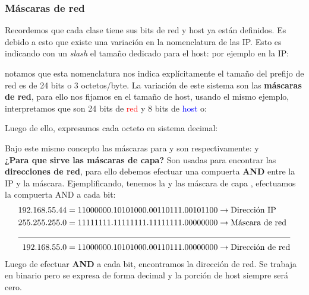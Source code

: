 \documentclass[
	12pt, %
	fleqn, %
	a4paper, %
	oneside, %
]{LegrandOrangeBook}
\begin{document}
\subsubsection{Máscaras de red}
Recordemos que cada clase tiene sus bits de red y host ya están definidos. Es debido a esto que existe una variación en la nomenclatura de las IP. Esto es indicando con un \textit{slash} el  tamaño dedicado para el host: por ejemplo en la IP:\\
\begin{center}
\end{center}
notamos que esta nomenclatura nos indica explícitamente el tamaño del prefijo de red es de 24 bits o 3 octetos/byte. La variación de este sistema son las \textbf{máscaras de red}, para ello nos fijamos en el tamaño de host, usando el mismo ejemplo, interpretamos que son 24 bits de \textcolor{red}{red} y 8 bits de \textcolor{blue}{host} o:\\
\begin{center}
\ipAddress{\textcolor{red}{111111111111111111111111}\textcolor{blue}{00000000}}
\end{center}
Luego de ello, expresamos cada octeto en sistema decimal:\\
\begin{center}
\end{center}
Bajo este mismo concepto las máscaras para  y  son respectivamente:  y \\
\textbf{¿Para que sirve las máscaras de capa?} Son usadas para encontrar las \textbf{direcciones de red}, para ello debemos efectuar una compuerta \textbf{AND} entre la IP y la máscara. Ejemplificando, tenemos la  y las máscara de capa , efectuamos la compuerta AND a cada bit:\\
\begin{align*}
192.168.55.44&=11000000.10101000.00110111.00101100 \rightarrow\text{Dirección IP}\\
255.255.255.0&=11111111.11111111.11111111.00000000 \rightarrow\text{Máscara de red}\\
\cline{1-2}
192.168.55.0&=11000000.10101000.00110111.00000000 \rightarrow\text{Dirección de red}
\end{align*}
Luego de efectuar \textbf{AND} a cada bit, encontramos la dirección de red. Se trabaja en binario pero se expresa de forma decimal y la porción de host siempre será cero.
\end{document}
